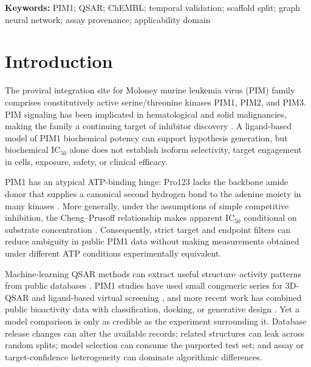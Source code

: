 \documentclass[11pt]{article}
\begin{document}
\begin{abstract}
development-only nested search spanning architecture, optimization,
featurization, initialization, and a frozen pretrained CheMeleon representation
obtained best RMSE \TunedGNNBestRMSE{}, but its paired RMSE difference from
the locked Ridge reference was \TunedGNNBestDelta{} (95\% CI
\TunedGNNBestDeltaLower{} to \TunedGNNBestDeltaUpper{}); it was not allowed to
alter the already completed temporal analysis. The principal finding
is that sealed temporal evaluation revealed reliability failures obscured by
pooled performance. This retrospective biochemical-potency benchmark does not
establish prospective activity, selectivity, cellular efficacy, ADMET properties,
or therapeutic value.
\end{abstract}

\noindent\textbf{Keywords:} PIM1; QSAR; ChEMBL; temporal validation;
scaffold split; graph neural network; assay provenance; applicability domain

\section{Introduction}

The proviral integration site for Moloney murine leukemia virus (PIM) family
comprises constitutively active serine/threonine kinases PIM1, PIM2, and PIM3.
PIM signaling has been implicated in hematological and solid malignancies, making
the family a continuing target of inhibitor discovery
\citep{nawijn2011pim,tursynbay2016pim}. A ligand-based model of PIM1 biochemical
potency can support hypothesis generation, but biochemical IC$_{50}$ alone does
not establish isoform selectivity, target engagement in cells, exposure, safety,
or clinical efficacy.

PIM1 has an atypical ATP-binding hinge: Pro123 lacks the backbone amide donor
that supplies a canonical second hydrogen bond to the adenine moiety in many
kinases \citep{kumar2005pim}. More generally, under the assumptions of simple
competitive inhibition, the Cheng--Prusoff relationship makes apparent
IC$_{50}$ conditional on substrate concentration \citep{cheng1973relationship}.
Consequently, strict target and endpoint filters can reduce ambiguity in public
PIM1 data without making measurements obtained under different ATP conditions
experimentally equivalent.

Machine-learning QSAR methods can extract useful structure--activity patterns
from public databases \citep{cherkasov2014qsar}. PIM1 studies have used small
congeneric series for 3D-QSAR and ligand-based virtual screening
\citep{aouidate2018qsar,asati2017qsar}, and more recent work has combined public
bioactivity data with classification, docking, or generative design
\citep{almukadi2023combining,schneider2020virtualpim}. Yet a model comparison is only
as credible as the experiment surrounding it. Database release changes can alter
the available records; related structures can leak across random splits; model
selection can consume the purported test set; and assay or target-confidence
heterogeneity can dominate algorithmic differences.
\end{document}
